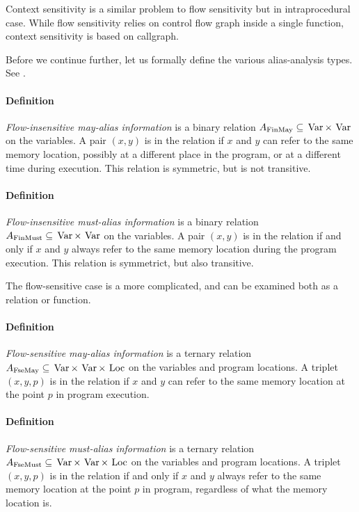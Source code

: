Context sensitivity is a similar problem to flow sensitivity but in
intraprocedural case. While flow sensitivity relies on control flow graph inside
a single function, context sensitivity is based on callgraph. 

Before we continue further, let us formally define the various alias-analysis
types. See \cite{muchnick1997advanced}.

\paragraph{Definition} {\it Flow-insensitive may-alias information} is a binary
relation $A_{\mathrm{FinMay}} \subseteq \operatorname*{\,Var} \times \operatorname*{\,Var} $ on the variables. A pair
$(x,y)$ is in the relation if $x$ and $y$ can refer to the same
memory location, possibly at a different place in the program, or at a different
time during execution. This relation is symmetric, but is not transitive.

\paragraph{Definition} {\it Flow-insensitive must-alias information} is a binary
relation $A_{\mathrm{FinMust}} \subseteq \operatorname*{\,Var} \times \operatorname*{\,Var}$ on the variables. A pair
$(x,y)$ is in the relation if and only if $x$ and $y$ always refer to the same
memory location during the program execution. This relation is symmetrict, but
also transitive. 

The flow-sensitive case is a more complicated, and can be examined both as a
relation or function.

\paragraph{Definition} {\it Flow-sensitive may-alias information} is a ternary
relation $A_{\mathrm{FseMay}} \subseteq \operatorname*{\,Var} \times \operatorname*{\,Var} \times \operatorname*{\,Loc}$ on the variables
and program locations. A triplet $(x,y,p)$ is in the relation if $x$
and $y$ can refer to the same memory location at the point $p$ in program
execution.

\paragraph{Definition} {\it Flow-sensitive must-alias information} is a ternary
relation $A_{\mathrm{FseMust}} \subseteq \operatorname*{\,Var} \times \operatorname*{\,Var} \times \operatorname*{\,Loc}$ on the variables
and program locations. A triplet $(x,y,p)$ is in the relation if and only if $x$
and $y$ always refer to the same memory location at the point $p$ in program,
regardless of what the memory location is.

